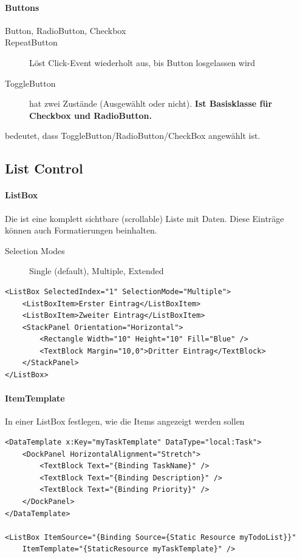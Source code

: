 \paragraph{Buttons}
\begin{description}
    \item[Button, RadioButton, Checkbox]
    \item[RepeatButton] Löst Click-Event wiederholt aus, bis Button losgelassen wird
    \item[ToggleButton] hat zwei Zustände (Ausgewählt oder nicht). \textbf{Ist Basisklasse für Checkbox und RadioButton.}
\end{description}
 bedeutet, dass ToggleButton/RadioButton/CheckBox angewählt ist.

\subsection{List Control}
\paragraph{ListBox}
Die  ist eine komplett sichtbare (scrollable) Liste mit Daten. Diese Einträge können auch Formatierungen beinhalten. 
\begin{description}
    \item[Selection Modes] Single (default), Multiple, Extended
\end{description}
\begin{lstlisting}
<ListBox SelectedIndex="1" SelectionMode="Multiple">
    <ListBoxItem>Erster Eintrag</ListBoxItem>
    <ListBoxItem>Zweiter Eintrag</ListBoxItem>
    <StackPanel Orientation="Horizontal">
        <Rectangle Width="10" Height="10" Fill="Blue" />
        <TextBlock Margin="10,0">Dritter Eintrag</TextBlock>
    </StackPanel>
</ListBox>
\end{lstlisting}

\paragraph{ItemTemplate}
In einer ListBox festlegen, wie die Items angezeigt werden sollen
\begin{lstlisting}
<DataTemplate x:Key="myTaskTemplate" DataType="local:Task">
    <DockPanel HorizontalAlignment="Stretch">
        <TextBlock Text="{Binding TaskName}" />
        <TextBlock Text="{Binding Description}" />
        <TextBlock Text="{Binding Priority}" />
    </DockPanel>
</DataTemplate>

<ListBox ItemSource="{Binding Source={Static Resource myTodoList}}"
    ItemTemplate="{StaticResource myTaskTemplate}" />
\end{lstlisting}

